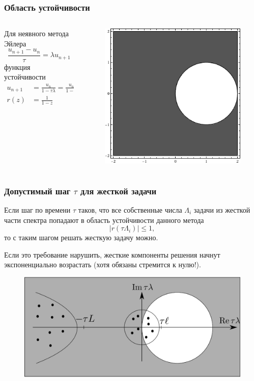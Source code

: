 \documentclass[professionalfonts,compress,unicode,aspectratio=169]{beamer}
\begin{document}
\begin{frame}\frametitle{Область устойчивости}
	\begin{columns}[T]
	\begin{column}{.5\textwidth}
	Для неявного метода Эйлера
	\[
	\frac{u_{n+1}-u_n}{\tau} = \lambda u_{n+1}
	\]
	функция устойчивости
	\begin{align*}
	u_{n+1} &= \frac{u_n}{1 - \tau \lambda} = \frac{u_n}{1 - z}\\
	r(z) &= \frac{1}{1-z}
	\end{align*}
	\end{column}
	\begin{column}{.5\textwidth}
	\begin{figure}%
	\includegraphics[height=.75\textheight]{euleri.png}%
	\end{figure}
	\end{column}
	\end{columns}
\end{frame}

\begin{frame}\frametitle{Допустимый шаг $\tau$ для жесткой задачи}
	Если шаг по времени $\tau$ таков, что все собственные числа $\Lambda_i$
задачи из жесткой части спектра попадают в область устойчивости данного метода
	\[
		|r(\tau \Lambda_i)| \leq 1,
	\]
	то с таким шагом решать жесткую задачу можно.

	Если это требование нарушить,
жесткие компоненты решения начнут экспоненциально возрастать (хотя обязаны
стремится к нулю!).
	\begin{figure}
	\centering
	\includegraphics[height=.4\textheight]{stabreg.eps}
	\end{figure}
\end{frame}
\end{document}
